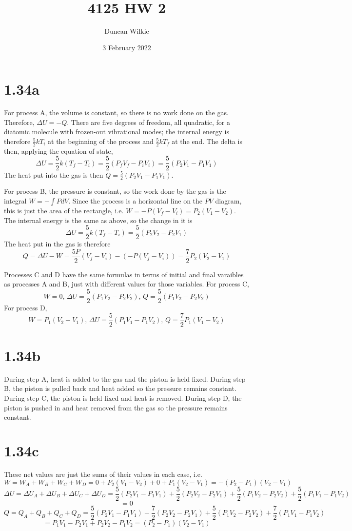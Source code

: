 \documentclass{article}
\title{4125 HW 2}
\author{Duncan Wilkie}
\date{3 February 2022}
\begin{document}
\maketitle

\section*{1.34a}
For process A, the volume is constant, so there is no work done on the gas. Therefore, $\Delta U=-Q$. There are five degrees of freedom, all quadratic, for a diatomic molecule with frozen-out vibrational modes; the internal energy is therefore $\frac{5}{2}kT_i$ at the beginning of the process and $\frac{5}{2}kT_f$ at the end. The delta is then, applying the equation of state,
\[\Delta U=\frac{5}{2}k(T_f-T_i)=\frac{5}{2}\left(P_fV_f-P_iV_i \right)=\frac{5}{2}(P_2V_1-P_1V_1)\]
The heat put into the gas is then $Q=\frac{5}{2}(P_2V_1-P_1V_1)$.

For process B, the pressure is constant, so the work done by the gas is the integral $W=-\int PdV$. Since the process is a horizontal line on the $PV$ diagram, this is just the area of the rectangle, i.e. $W=-P(V_f-V_i)=P_2(V_1-V_2)$. The internal energy is the same as above, so the change in it is
\[\Delta U=\frac{5}{2}k(T_f-T_i)=\frac{5}{2}(P_2V_2-P_2V_1)\]
The heat put in the gas is therefore \[Q=\Delta U-W=\frac{5P}{2}(V_f-V_i)-(-P(V_f-V_i))=\frac{7}{2}P_2(V_2-V_1)\]

Processes C and D have the same formulas in terms of initial and final varaibles as processes A and B, just with different values for those variables.
For process C,
\[W=0\textrm{, } \Delta U=\frac{5}{2}(P_1V_2-P_2V_2)\textrm{, } Q=\frac{5}{2}(P_1V_2-P_2V_2)\]
For process D,
\[W=P_1(V_2-V_1)\textrm{, }\Delta U=\frac{5}{2}(P_1V_1-P_1V_2)\textrm{, }Q=\frac{7}{2}P_1(V_1-V_2)\]

\section*{1.34b}
During step A, heat is added to the gas and the piston is held fixed. During step B, the piston is pulled back and heat added so the pressure remains constant. During step C, the piston is held fixed and heat is removed. During step D, the piston is pushed in and heat removed from the gas so the pressure remains constant.

\section*{1.34c}
These net values are just the sums of their values in each case, i.e.
\[W=W_A+W_B+W_C+W_D=0+P_2(V_1-V_2)+0+P_1(V_2-V_1)=-(P_2-P_1)(V_2-V_1)\]
\[\Delta U=\Delta U_A+\Delta U_B+\Delta U_C+\Delta U_D=\frac{5}{2}(P_2V_1-P_1V_1)+\frac{5}{2}(P_2V_2-P_2V_1)+\frac{5}{2}(P_1V_2-P_2V_2)+\frac{5}{2}(P_1V_1-P_1V_2)\]
\[=0\]
\[Q=Q_A+Q_B+Q_C+Q_D=\frac{5}{2}(P_2V_1-P_1V_1)+\frac{7}{2}(P_2V_2-P_2V_1)+\frac{5}{2}(P_1V_2-P_2V_2)+\frac{7}{2}(P_1V_1-P_1V_2)\]
\[=P_1V_1-P_2V_1+P_2V_2-P_1V_2=(P_2-P_1)(V_2-V_1)\]
\end{document}
